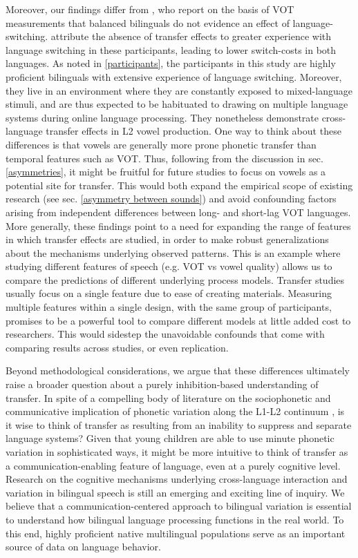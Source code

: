 \documentclass[12 pt]{article}
\begin{document}
Moreover, our findings differ from \cite{tsui2019impact}, who report on the basis of VOT measurements that balanced bilinguals do not evidence an effect of language-switching. \citeauthor{tsui2019impact} attribute the absence of transfer effects to greater experience with language switching in these participants, leading to lower switch-costs in both languages. As noted in \ref{participants}, the participants in this study are highly proficient bilinguals with extensive experience of language switching. Moreover, they live in an environment where they are constantly exposed to mixed-language stimuli, and are thus expected to be habituated to drawing on multiple language systems during online language processing. They nonetheless demonstrate cross-language transfer effects in L2 vowel production. One way to think about these differences is that vowels are generally more prone phonetic transfer than temporal features such as VOT. Thus, following from the discussion in sec. \ref{asymmetries}, it might be fruitful for future studies to focus on vowels as a potential site for transfer. This would both expand the empirical scope of existing research (see sec. \ref{asymmetry between sounds}) and avoid confounding factors arising from independent differences between long- and short-lag VOT languages. More generally, these findings point to a need for expanding the range of features in which transfer effects are studied, in order to make robust generalizations about the mechanisms underlying observed patterns. This is an example where studying different features of speech (e.g. VOT vs vowel quality) allows us to compare the predictions of different underlying process models. Transfer studies usually focus on a single feature due to ease of creating materials. Measuring multiple features within a single design, with the same group of participants, promises to be a powerful tool to compare different models at little added cost to researchers. This would sidestep the unavoidable confounds that come with comparing results across studies, or even replication.

Beyond methodological considerations, we argue that these differences ultimately raise a broader question about a purely inhibition-based understanding of transfer. In spite of a compelling body of literature on the sociophonetic and communicative implication of phonetic variation along the L1-L2 continuum \citep[e.g.][]{khattab2013phonetic,agnihotri1979processes,stuart2011hybridity}, is it wise to think of transfer as resulting from an inability to suppress and separate language systems? Given that young children are able to use minute phonetic variation in sophisticated ways, it might be more intuitive to think of transfer as a communication-enabling feature of language, even at a purely cognitive level. Research on the cognitive mechanisms underlying cross-language interaction and variation in bilingual speech is still an emerging and exciting line of inquiry. We believe that a communication-centered approach to bilingual variation is essential to understand how bilingual language processing functions in the real world. To this end, highly proficient native multilingual populations serve as an important source of data on language behavior. 
\end{document}
